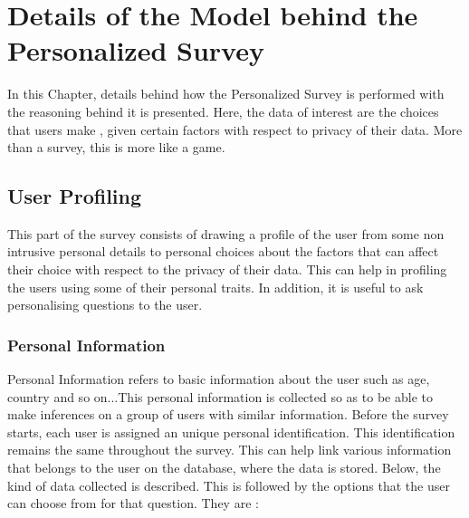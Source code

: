 \chapter{Details of the Model behind the Personalized Survey}

In this Chapter, details behind how the Personalized Survey is performed with the
reasoning behind it is presented. Here, the data of interest are the choices that users make
, given certain factors with respect to privacy of their data. More than a survey, this is more like a game.

\section{User Profiling}    \label{profiling_questions}

This part of the survey consists of drawing a profile of the user from some non intrusive
personal details to personal choices about the factors that can affect their choice with respect to the privacy of their data.
This can help in profiling the users using some of their personal traits. In addition, it is useful to ask personalising questions
to the user.



\subsection{Personal Information}    \label{personal_info} 

Personal Information refers to basic information about the user such as age, country and so on...This personal information is collected 
so as to be able to make inferences on a group of users with similar information. Before the survey starts, each user
is assigned an unique personal identification. This identification remains the same throughout the survey. This can help link various information that belongs to the user
on the database, where the data is stored. Below, the kind of data collected is described. This is followed by the options that the user can choose from for that question.
They are :

